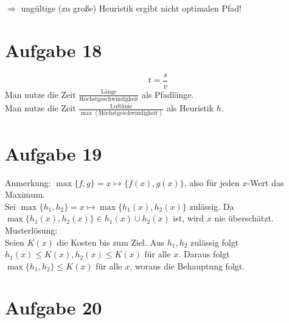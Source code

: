 \documentclass{scrreprt}
\begin{document}
\begin{anumerate}
\begin{center}
\end{center}
\medskip
\begin{center}
\end{center}
\medskip
\begin{center}
\end{center}
$\Rightarrow$ ungültige (zu große) Heuristik ergibt nicht optimalen Pfad!
\end{anumerate}

\section{Aufgabe 18}
$$t=\frac{s}{v}$$
Man nutze die Zeit $\frac{\text{Länge}}{\text{Höchstgeschwindigkeit}}$ als Pfadlänge.\\
Man nutze die Zeit $\frac{\text{Luftlinie}}{\max(\text{Höchstgeschwindigkeit})}$ als Heuristik $h$.

\section{Aufgabe 19}
Anmerkung: $\max\{f,g\}=x\mapsto \{f(x), g(x)\}$, also für jeden $x$-Wert das Maximum.\\
Sei $\max\{h_1, h_2\}=x \mapsto \max\{h_1(x), h_2(x)\}$ zulässig. Da $\max\{h_1(x), h_2(x)\}\in h_1(x) \cup h_2(x)$ ist, wird $x$ nie überschätzt.\bigskip\\
Musterlösung:\\
Seien $K(x)$ die Kosten bis zum Ziel. Aus $h_1, h_2$ zulässig folgt $h_1(x)\leq K(x), h_2(x)\leq K(x)$ für alle $x$. Daraus folgt $\max\{h_1, h_2\} \leq K(x)$ für alle $x$, woraus die Behauptung folgt. 


\section{Aufgabe 20}

\end{document}
